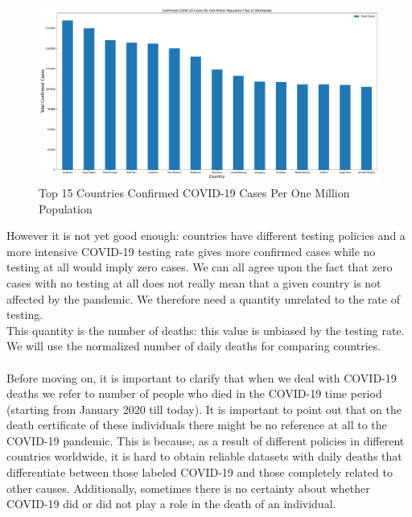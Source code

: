 \documentclass[11pt,a4paper]{article}
\begin{document}
\begin{figure}[H]
    \begin{center}
        \hspace*{-0.2cm}
        \includegraphics[scale=0.32]{img/total-cases-per-million.pdf}
    \end{center}
    \vspace{-0.3cm}
    \caption{Top 15 Countries Confirmed COVID-19 Cases Per One Million Population}
\end{figure}
\noindent
However it is not yet good enough: countries have different testing policies and
a more intensive COVID-19 testing rate gives more confirmed cases while no
testing at all would imply zero cases. We can all agree upon the fact that zero
cases with no testing at all does not really mean that a given country is not
affected by the pandemic. We therefore need a quantity unrelated to the rate of
testing.\\
This quantity is the number of deaths: this value is unbiased by the testing
rate. We will use the normalized number of daily deaths for comparing
countries.\\
\\
Before moving on, it is important to clarify that when we deal with COVID-19
deaths we refer to number of people who died in the COVID-19 time period
(starting from January 2020 till today). It is important to point out that
on the death certificate of these individuals there might be no reference at
all to the COVID-19 pandemic. This is because, as a result of different
policies in different countries worldwide, it is hard to obtain reliable
datasets with daily deaths that differentiate between those labeled COVID-19
and those completely related to other causes. Additionally, sometimes there is
no certainty about whether COVID-19 did or did not play a role in the death of
an individual.\\
\end{document}
